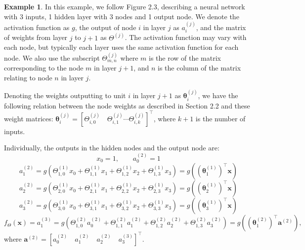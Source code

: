 \documentclass[honours,12pt]{unswthesis}
\numberwithin{equation}{section}
\theoremstyle{definition}
\newtheorem{example}[theorem]{Example}
\begin{document}
\newpage
\begin{example}
In this example, we follow Figure 2.3, describing a neural network with 3 inputs, 1 hidden layer with 3 nodes and 1 output node. We denote the activation function as $g$, the output of node $i$ in layer $j$ as $a^{(j)}_i$, and the matrix of weights from layer $j$ to $j+1$ as $\Theta^{(j)}$. The activation function may vary with each node, but typically each layer uses the same activation function for each node. We also use the subscript $\Theta^{(j)}_{m,n}$ where $m$ is the row of the matrix corresponding to the node $m$ in layer $j+1$, and $n$ is the column of the matrix relating to node $n$ in layer $j$.

Denoting the weights outputting to unit $i$ in layer $j+1$ as $\bm{\theta}^{(j)}_i$, we have the following relation between the node weights as described in Section 2.2 and these weight matrices: $\bm{\theta}^{(j)}_i = [\Theta_{i,0}^{(j)}\quad \Theta_{i,1}^{(j)}\cdots \Theta_{i,k}^{(j)}]^\top$, where $k+1$ is the number of inputs.

Individually, the outputs in the hidden nodes and the output node are:
\[x_0=1,\qquad a_0^{(2)}=1\]
\[a_1^{(2)}=g(\Theta^{(1)}_{1,0}x_0+\Theta^{(1)}_{1,1}x_1+\Theta^{(1)}_{1,2}x_2+\Theta^{(1)}_{1,3}x_3)=g((\bm{\theta}^{(1)}_1)^\intercal\bm{x})\]
\[a_2^{(2)}=g(\Theta^{(1)}_{2,0}x_0+\Theta^{(1)}_{2,1}x_1+\Theta^{(1)}_{2,2}x_2+\Theta^{(1)}_{2,3}x_3)=g((\bm{\theta}^{(1)}_2)^\top\bm{x})\]
\[a_3^{(2)}=g(\Theta^{(1)}_{3,0}x_0+\Theta^{(1)}_{3,1}x_1+\Theta^{(1)}_{3,2}x_2+\Theta^{(1)}_{3,3}x_3)=g((\bm{\theta}^{(1)}_3)^\top\bm{x})\]
\[f_\Theta(\bm{x})=a_1^{(3)}=g(\Theta^{(2)}_{1,0}a_0^{(2)}+\Theta^{(2)}_{1,1}a_1^{(2)}+\Theta^{(2)}_{1,2}a_2^{(2)}+\Theta^{(2)}_{1,3}a_3^{(2)})=g((\bm{\theta}^{(2)}_1)^\top\bm{a}^{(2)}),\]
where $\bm{a}^{(2)}=[a_0^{(2)}\quad a_1^{(2)}\quad a_2^{(2)}\quad a_3^{(3)}]^\top$.
\end{example}
\newpage
\end{document}
